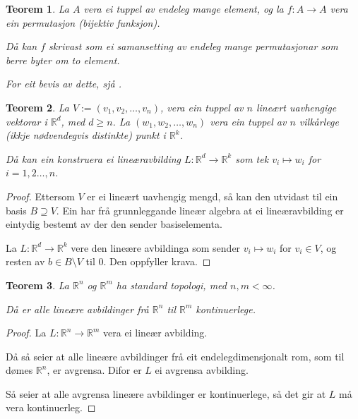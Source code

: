 \documentclass[a4paper, 12pt, norsk]{article}
\theoremstyle{plain}
\newtheorem{theorem}{Teorem}[section]
\theoremstyle{definition}
\newcommand{\Rb}{\mathbb{R}}
\newcommand{\tuple}[1]{ \left( #1 \right) } %
\begin{document}
\begin{theorem} \label{thm:permutasjon}
	La \( A \) vera ei tuppel av endeleg mange element, og la \( f: A \to A \) vera ein permutasjon (bijektiv funksjon).
	
	Då kan \( f \) skrivast som ei samansetting av endeleg mange permutasjonar som berre byter om to element.

	For eit bevis av dette, sjå \cite[s. 130]{MR1304051}.
\end{theorem}

\begin{theorem} \label{thm:definer-lin-op}
	La \( V := \tuple{v_1, v_2, \dots, v_n} \), vera ein tuppel av \( n \) lineært uavhengige vektorar i \( \Rb^d \), med \( d \geq n \). La \( \tuple{w_1, w_2, \dots, w_n} \) vera ein tuppel av \( n \) vilkårlege (ikkje nødvendegvis distinkte) punkt i \( \Rb^k \).
	
	Då kan ein konstruera ei lineæravbilding \( L : \Rb^d \to \Rb^k \) som tek \( v_i \mapsto w_i \) for \( i = 1, 2 \dots, n \).
\end{theorem}

\begin{proof}
	Ettersom \( V \) er ei lineært uavhengig mengd, så kan den utvidast til ein basis \( B \supseteq V \). Ein har frå grunnleggande lineær algebra at ei lineæravbilding er eintydig bestemt av der den sender basiselementa.

	La \( L : \Rb^d \to \Rb^k \) vere den lineære avbildinga som sender \( v_i \mapsto w_i \) for \( v_i \in V \), og resten av \( b \in B \setminus V \) til \( 0 \). Den oppfyller krava.
\end{proof}

\begin{theorem} \label{thm:avgrensa-lin-op-er-kont}
	La \( \Rb^n \) og \( \Rb^m \) ha standard topologi, med \( n, m < \infty \).

	Då er alle lineære avbildinger frå \( \Rb^n \) til \( \Rb^m \) kontinuerlege.
\end{theorem}

\begin{proof}
	La \( L : \Rb^n \to \Rb^m \) vera ei lineær avbilding.

	Då så seier \cite[Theroem 6.3.1]{MR3838450} at alle lineære avbildinger frå eit endelegdimensjonalt rom, som til dømes \( \Rb^n \), er avgrensa. Difor er \( L \) ei avgrensa avbilding.

	Så seier \cite[Theorem 6.4.1]{MR3838450} at alle avgrensa lineære avbildinger er kontinuerlege, så det gir at \( L \) må vera kontinuerleg.
\end{proof}
\end{document}
